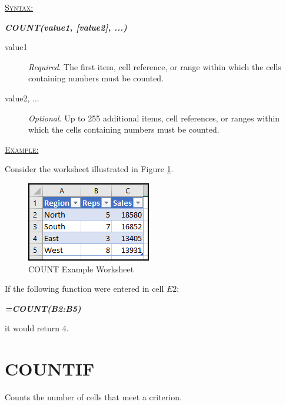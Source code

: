 \begin{addmargin}[1cm]{0cm}

	\medskip
	\underline{\textsc{Syntax:}}
	\medskip

	{\color{Syntax}
		\noindent\textbf{\textit{COUNT(value1, [value2], ...)}}
	}
	
	\begin{description}
		\item[value1] \textit{Required}. The first item, cell reference, or range within which the cells containing numbers must be counted.
		\item[value2, ...] \textit{Optional}. Up to 255 additional items, cell references, or ranges within which the cells containing numbers must be counted.
	\end{description}

	\medskip
	\noindent\underline{\textsc{Example:}}
	\medskip
	
	\noindent Consider the worksheet illustrated in Figure \ref{apa:cnt}.

	\begin{figure}[H]
		\centering
		\includegraphics[width=\maxwidth{.45\linewidth}]{gfx/apa_fig01}
		\caption{COUNT Example Worksheet}
		\label{apa:cnt}
	\end{figure}
	
	\noindent If the following function were entered in cell $ E2 $:
	
	{\color{Syntax}
		\textit{\textbf{=COUNT(B2:B5)}}
	}

	\noindent it would return $ 4 $.

\end{addmargin}

\section{COUNTIF}

Counts the number of cells that meet a criterion.

